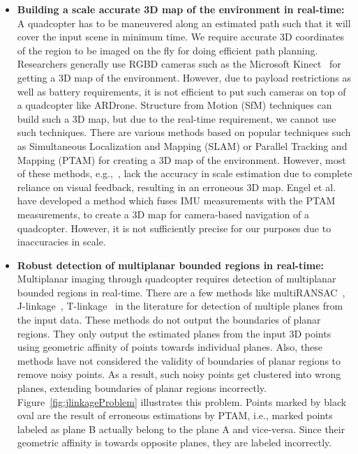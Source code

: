 \begin{itemize}
  \item \textbf{Building a scale accurate 3D map of the environment in
  real-time:} A quadcopter has to be maneuvered along an estimated path such
  that it will cover the input scene in minimum time. We require accurate
  3D coordinates of the region to be imaged on the fly for doing efficient path
  planning. Researchers generally use RGBD cameras such as the Microsoft
  Kinect~\cite{Zhang:2012} for getting a 3D map of the environment. However,
  due to payload restrictions as well as battery requirements, it is not
  efficient to put such cameras on top of a quadcopter like ARDrone. Structure
  from Motion (SfM) techniques can build such a 3D map, but due to the
  real-time requirement, we cannot use such techniques. There are various
  methods based on popular techniques such as Simultaneous Localization and
  Mapping (SLAM) or Parallel Tracking and Mapping (PTAM) for creating a 3D map
  of the environment. However, most of these methods, e.g.,~\cite{klein}, lack
  the accuracy in scale estimation due to complete reliance on visual feedback,
  resulting in an erroneous 3D map. Engel et al.~\cite{engel} have developed a
  method which fuses IMU measurements with the PTAM measurements, to create a
  3D map for camera-based navigation of a quadcopter. However, it is not
  sufficiently precise for our purposes due to inaccuracies in scale.
  
  \item \textbf{Robust detection of multiplanar bounded regions in real-time:} 
  Multiplanar imaging through quadcopter requires detection of multiplanar
  bounded regions in real-time. There are a few methods like
  multiRANSAC~\cite{zuliani}, J-linkage~\cite{jlinkage},
  T-linkage~\cite{tlinkage} in the literature for detection of multiple planes
  from the input data. These methods do not output the boundaries of planar
  regions. They only output the estimated planes from the input 3D points using
  geometric affinity of points towards individual planes. Also, these methods
  have not considered the validity of boundaries of planar regions to remove
  noisy points. As a result, such noisy points get clustered into wrong planes,
  extending boundaries of planar regions incorrectly.
  Figure~\ref{fig:jlinkageProblem} illustrates this problem. Points marked by
  black oval are the result of erroneous estimations by PTAM, i.e., marked
  points labeled as plane B actually belong to the plane A and vice-versa. 
  Since their geometric affinity is towards opposite planes, they are labeled
  incorrectly.


\end{itemize}
